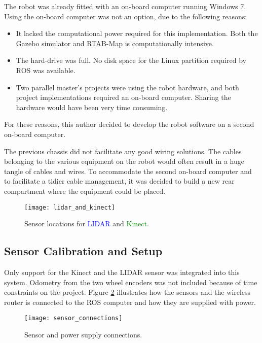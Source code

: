 The robot was already fitted with an on-board computer running Windows 7. Using the on-board computer was not an option, due to the following reasons:
\begin{itemize}
\item It lacked the computational power required for this implementation. Both the Gazebo simulator and \ac{RTAB-Map} is computationally intensive.
\item The hard-drive was full. No disk space for the Linux partition required by \ac{ROS} was available.
\item Two parallel master's projects were using the robot hardware, and both project implementations required an on-board computer. Sharing the hardware would have been very time consuming.
\end{itemize} 

For these reasons, this author decided to develop the robot software on a second on-board computer. 

The previous chassis did not facilitate any good wiring solutions. The cables belonging to the various equipment on the robot would often result in a huge tangle of cables and wires. To accommodate the second on-board computer and to facilitate a tidier cable management, it was decided to build a new rear compartment where the equipment could be placed.




\begin{figure}[h]
	\centering
	\texttt{[image: lidar\_and\_kinect]}
	\caption{Sensor locations for \textcolor{blue}{LIDAR} and \textcolor{green}{Kinect}. }
	\label{fig:kinect_and_lidar}
\end{figure}

\subsection{Sensor Calibration and Setup}

Only support for the Kinect and the \ac{LIDAR} sensor was integrated into this system. Odometry from the two wheel encoders was not included because of time constraints on the project. Figure \ref{fig:sensor_connections} illustrates how the sensors and the wireless router is connected to the \ac{ROS} computer and how they are supplied with power.

\begin{figure}[h]
	\centering
	\texttt{[image: sensor\_connections]}
	\caption{Sensor and power supply connections. }
	\label{fig:sensor_connections}
\end{figure}


